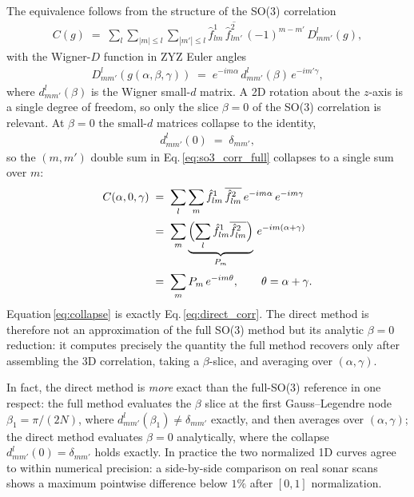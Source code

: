 The equivalence follows from the structure of the SO(3) correlation
\begin{align}
    C(g) \;=\; \sum_{l}\sum_{|m|\leq l}\sum_{|m'|\leq l}
              \hat{f}^{1}_{lm}\,\overline{\hat{f}^{2}_{lm'}}\,
              (-1)^{m-m'}\,D^{l}_{mm'}(g),
    \label{eq:so3_corr_full}
\end{align}
with the Wigner-$D$ function in ZYZ Euler angles
\begin{align}
    D^{l}_{mm'}(g(\alpha,\beta,\gamma))
        \;=\; e^{-im\alpha}\,d^{l}_{mm'}(\beta)\,e^{-im'\gamma},
\end{align}
where $d^{l}_{mm'}(\beta)$ is the Wigner small-$d$ matrix. A 2D rotation about
the $z$-axis is a single degree of freedom, so only the slice $\beta=0$ of the
SO(3) correlation is relevant. At $\beta=0$ the small-$d$ matrices collapse to
the identity,
\begin{align}
    d^{l}_{mm'}(0) \;=\; \delta_{mm'},
\end{align}
so the $(m,m')$ double sum in Eq.\,\ref{eq:so3_corr_full} collapses to a single
sum over $m$:
\begin{align}
    C(\alpha,0,\gamma)
        &\;=\; \sum_{l}\sum_{m}
              \hat{f}^{1}_{lm}\,\overline{\hat{f}^{2}_{lm}}\,
              e^{-im\alpha}\,e^{-im\gamma} \\[2pt]
        &\;=\; \sum_{m}
              \underbrace{\Bigl(\sum_{l}\hat{f}^{1}_{lm}
              \overline{\hat{f}^{2}_{lm}}\Bigr)}_{P_{m}}\,
              e^{-im(\alpha+\gamma)} \\[2pt]
        &\;=\; \sum_{m} P_{m}\,e^{-im\theta},
        \qquad \theta=\alpha+\gamma.
    \label{eq:collapse}
\end{align}
Equation\,\ref{eq:collapse} is exactly Eq.\,\ref{eq:direct_corr}. The direct
method is therefore not an approximation of the full SO(3) method but its
analytic $\beta=0$ reduction: it computes precisely the quantity the full method
recovers only after assembling the 3D correlation, taking a $\beta$-slice, and
averaging over $(\alpha,\gamma)$.

In fact, the direct method is \emph{more} exact than the full-SO(3) reference in
one respect: the full method evaluates the $\beta$ slice at the first
Gauss--Legendre node $\beta_{1}=\pi/(2N)$, where
$d^{l}_{mm'}(\beta_{1})\neq\delta_{mm'}$ exactly, and then averages over
$(\alpha,\gamma)$; the direct method evaluates $\beta=0$ analytically, where the
collapse $d^{l}_{mm'}(0)=\delta_{mm'}$ holds exactly. In practice the two
normalized 1D curves agree to within numerical precision: a side-by-side
comparison on real sonar scans shows a maximum pointwise difference below $1\%$
after $[0,1]$ normalization.


